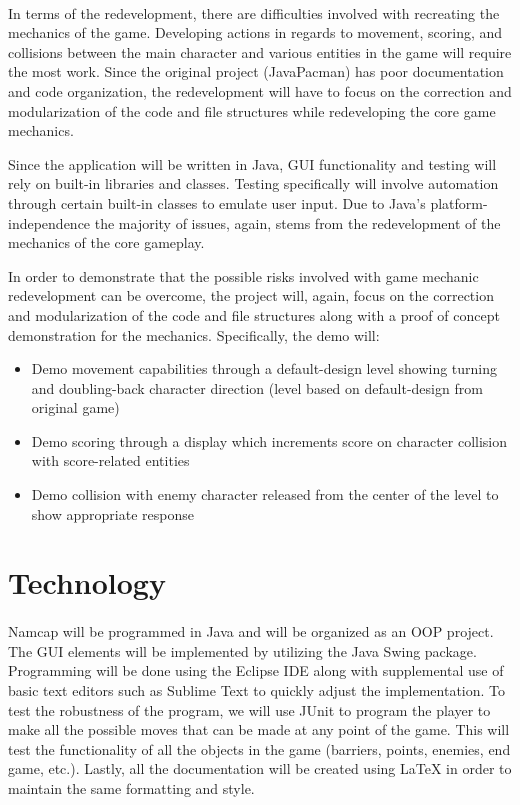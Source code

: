 \documentclass{article}
\begin{document}
\paragraph{}
In terms of the redevelopment, there are difficulties involved with recreating the mechanics of the game. Developing actions in regards to movement, scoring, and collisions between the main character and various entities in the game will require the most work. Since the original project (JavaPacman) has poor documentation and code organization, the redevelopment will have to focus on the correction and modularization of the code and file structures while redeveloping the core game mechanics.\par Since the application will be written in Java, GUI functionality and testing will rely on built-in libraries and classes. Testing specifically will involve automation through certain built-in classes to emulate user input. Due to Java's platform-independence the majority of issues, again, stems from the redevelopment of the mechanics of the core gameplay.\par In order to demonstrate that the possible risks involved with game mechanic redevelopment can be overcome, the project will, again, focus on the correction and modularization of the code and file structures along with a proof of concept demonstration for the mechanics. Specifically, the demo will:
\begin{itemize}
\item Demo movement capabilities through a default-design level showing turning and doubling-back character direction (level based on default-design from original game)
\item Demo scoring through a display which increments score on character collision with score-related entities
\item Demo collision with enemy character released from the center of the level to show appropriate response
\end{itemize}

\section{Technology}

\paragraph{}
Namcap will be programmed in Java and will be organized as an OOP project. The GUI elements will be implemented by utilizing the Java Swing package. Programming will be done using the Eclipse IDE along with supplemental use of basic text editors such as Sublime Text to quickly adjust the implementation. To test the robustness of the program, we will use JUnit to program the player to make all the possible moves that can be made at any point of the game. This will test the functionality of all the objects in the game (barriers, points, enemies, end game, etc.). Lastly, all the documentation will be created using LaTeX in order to maintain the same formatting and style.
\end{document}
